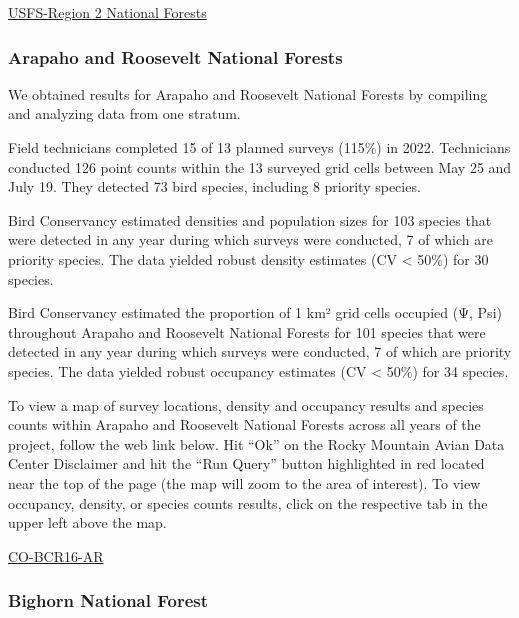 \documentclass[
  letterpaper,
  DIV=11,
  numbers=noendperiod,
  oneside]{scrreprt}
\begin{document}
\href{http://www.rmbo.org/new_site/adc/QueryWindow.aspx\#N4IgzgrgDgpgTmALnAhoiBbEAuABCAVQGUAxIgWgCUYBzASwHsA7XAJlwDk1GmUAbXCQZwYSMCAC+QA=}{USFS-Region
2 National Forests}

\hypertarget{arapaho-and-roosevelt-national-forests}{%
\subsubsection{Arapaho and Roosevelt National
Forests}\label{arapaho-and-roosevelt-national-forests}}

We obtained results for Arapaho and Roosevelt National Forests by
compiling and analyzing data from one stratum.

Field technicians completed 15 of 13 planned surveys (115\%) in 2022.
Technicians conducted 126 point counts within the 13 surveyed grid cells
between May 25 and July 19. They detected 73 bird species, including 8
priority species.

Bird Conservancy estimated densities and population sizes for 103
species that were detected in any year during which surveys were
conducted, 7 of which are priority species. The data yielded robust
density estimates (CV \textless{} 50\%) for 30 species.

Bird Conservancy estimated the proportion of 1 km² grid cells occupied
(Ψ, Psi) throughout Arapaho and Roosevelt National Forests for 101
species that were detected in any year during which surveys were
conducted, 7 of which are priority species. The data yielded robust
occupancy estimates (CV \textless{} 50\%) for 34 species.

To view a map of survey locations, density and occupancy results and
species counts within Arapaho and Roosevelt National Forests across all
years of the project, follow the web link below. Hit ``Ok'' on the Rocky
Mountain Avian Data Center Disclaimer and hit the ``Run Query'' button
highlighted in red located near the top of the page (the map will zoom
to the area of interest). To view occupancy, density, or species counts
results, click on the respective tab in the upper left above the map.

\href{http://www.rmbo.org/new_site/adc/QueryWindow.aspx\#N4IgzgLgTghhCuBbEAuABCAwgeQLQCFMAlARgDZcBBI9S2ABxgAsB7NGAOwBM0iWWwAUwBuggDYQ0AOTgBLFhxhi0AMRZRBkMCAC+QA=}{CO-BCR16-AR}

\hypertarget{bighorn-national-forest}{%
\subsubsection{Bighorn National Forest}\label{bighorn-national-forest}}
\end{document}
